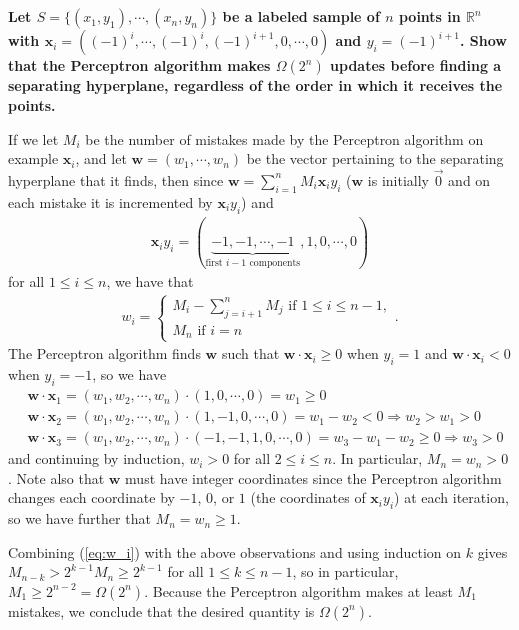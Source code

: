 \documentclass[a4paper,12pt]{article}
\theoremstyle{remark}
\newcommand{\bs}{\boldsymbol}
\begin{document}
\subsection{}
    \boldmath\textbf{Let $S = \{(x_1, y_1), \cdots, (x_n, y_n)\}$ be a labeled sample of $n$ points in $\mathbb{R}^n$ with $\bs{x}_i = ((-1)^i, \cdots, (-1)^i, (-1)^{i + 1}, 0, \cdots, 0)$ and $y_i = (-1)^{i + 1}$. Show that the Perceptron algorithm makes $\Omega(2^n)$ updates before finding a separating hyperplane, regardless of the order in which it receives the points.
    }\unboldmath \par
    If we let $M_i$ be the number of mistakes made by the Perceptron algorithm on example $\bs{x}_i$, and let $\bs{w} = (w_1, \cdots, w_n)$ be the vector pertaining to the separating hyperplane that it finds, then since $\bs{w} = \sum_{i = 1}^n M_i \bs{x}_i y_i$ ($\bs{w}$ is initially $\vec{0}$ and on each mistake it is incremented by $\bs{x}_i y_i$) and
    \begin{align*}
        \bs{x}_i y_i = (\underbrace{-1, -1, \cdots, -1}_{\text{first } i - 1 \text{ components}}, 1, 0, \cdots, 0)
    \end{align*}
    for all $1 \leq i \leq n$, we have that
    \begin{align} \label{eq:w_i}
        w_i = \begin{cases}
            M_i - \sum_{j = i + 1}^n M_j \text{ if } 1 \leq i \leq n - 1, \\
            M_n \text{ if } i = n
        \end{cases}.
    \end{align}
    The Perceptron algorithm finds $\bs{w}$ such that $\bs{w} \cdot \bs{x}_i \geq 0$ when $y_i = 1$ and $\bs{w} \cdot \bs{x}_i < 0$ when $y_i = -1$, so we have
    \begin{align*}
        &\bs{w} \cdot \bs{x}_1 = (w_1, w_2, \cdots, w_n) \cdot (1, 0, \cdots, 0) = w_1 \geq 0 \\
        &\bs{w} \cdot \bs{x}_2 = (w_1, w_2, \cdots, w_n) \cdot (1, -1, 0, \cdots, 0) = w_1 - w_2 < 0 \Rightarrow w_2 > w_1 > 0 \\
        &\bs{w} \cdot \bs{x}_3 = (w_1, w_2, \cdots, w_n) \cdot (-1, -1, 1, 0, \cdots, 0) = w_3 - w_1 - w_2 \geq 0 \Rightarrow w_3 > 0
    \end{align*}
    and continuing by induction, $w_i > 0$ for all $2 \leq i \leq n$. In particular, $M_n = w_n > 0$. Note also that $\bs{w}$ must have integer coordinates since the Perceptron algorithm changes each coordinate by $-1$, $0$, or $1$ (the coordinates of $\bs{x}_i y_i$) at each iteration, so we have further that $M_n = w_n \geq 1$. \par
    Combining (\ref{eq:w_i}) with the above observations and using induction on $k$ gives $M_{n - k} > 2^{k - 1} M_n \geq 2^{k - 1}$ for all $1 \leq k \leq n - 1$, so in particular, $M_1 \geq 2^{n - 2} = \Omega(2^n)$. Because the Perceptron algorithm makes at least $M_1$ mistakes, we conclude that the desired quantity is $\Omega(2^n)$.



\end{document}
